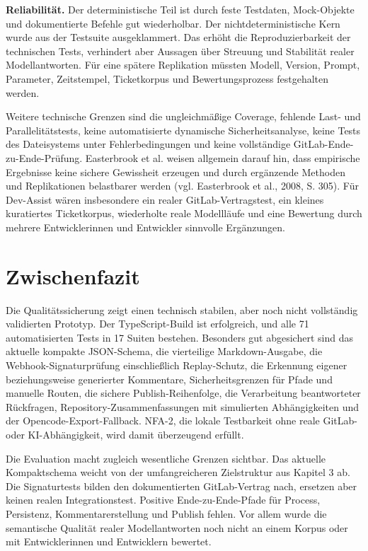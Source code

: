 \textbf{Reliabilität.} Der deterministische Teil ist durch feste Testdaten, Mock-Objekte und dokumentierte Befehle gut wiederholbar. Der nichtdeterministische Kern wurde aus der Testsuite ausgeklammert. Das erhöht die Reproduzierbarkeit der technischen Tests, verhindert aber Aussagen über Streuung und Stabilität realer Modellantworten. Für eine spätere Replikation müssten Modell, Version, Prompt, Parameter, Zeitstempel, Ticketkorpus und Bewertungsprozess festgehalten werden.

Weitere technische Grenzen sind die ungleichmäßige Coverage, fehlende Last- und Parallelitätstests, keine automatisierte dynamische Sicherheitsanalyse, keine Tests des Dateisystems unter Fehlerbedingungen und keine vollständige GitLab-Ende-zu-Ende-Prüfung. Easterbrook et al. weisen allgemein darauf hin, dass empirische Ergebnisse keine sichere Gewissheit erzeugen und durch ergänzende Methoden und Replikationen belastbarer werden (vgl. Easterbrook et al., 2008, S. 305). Für Dev-Assist wären insbesondere ein realer GitLab-Vertragstest, ein kleines kuratiertes Ticketkorpus, wiederholte reale Modellläufe und eine Bewertung durch mehrere Entwicklerinnen und Entwickler sinnvolle Ergänzungen.

\section{Zwischenfazit}

Die Qualitätssicherung zeigt einen technisch stabilen, aber noch nicht vollständig validierten Prototyp. Der TypeScript-Build ist erfolgreich, und alle 71 automatisierten Tests in 17 Suiten bestehen. Besonders gut abgesichert sind das aktuelle kompakte JSON-Schema, die vierteilige Markdown-Ausgabe, die Webhook-Signaturprüfung einschließlich Replay-Schutz, die Erkennung eigener beziehungsweise generierter Kommentare, Sicherheitsgrenzen für Pfade und manuelle Routen, die sichere Publish-Reihenfolge, die Verarbeitung beantworteter Rückfragen, Repository-Zusammenfassungen mit simulierten Abhängigkeiten und der Opencode-Export-Fallback. NFA-2, die lokale Testbarkeit ohne reale GitLab- oder KI-Abhängigkeit, wird damit überzeugend erfüllt.

Die Evaluation macht zugleich wesentliche Grenzen sichtbar. Das aktuelle Kompaktschema weicht von der umfangreicheren Zielstruktur aus Kapitel 3 ab. Die Signaturtests bilden den dokumentierten GitLab-Vertrag nach, ersetzen aber keinen realen Integrationstest. Positive Ende-zu-Ende-Pfade für Process, Persistenz, Kommentarerstellung und Publish fehlen. Vor allem wurde die semantische Qualität realer Modellantworten noch nicht an einem Korpus oder mit Entwicklerinnen und Entwicklern bewertet.

